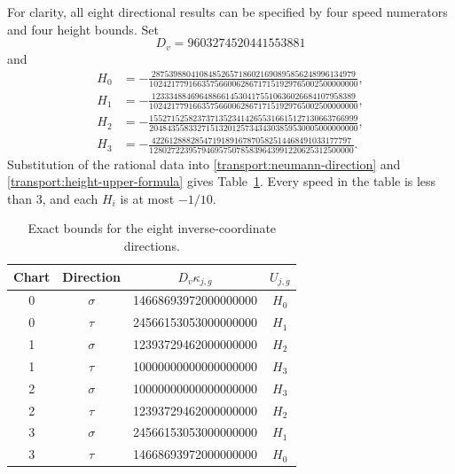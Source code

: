\documentclass[11pt,reqno]{amsart}
\theoremstyle{definition}
\theoremstyle{remark}
\begin{document}
For clarity, all eight directional results can be specified by four
speed numerators and four height bounds.  Set
\[
D_v=9603274520441553881
\]
and
\begin{align*}
H_0&=-\frac{28753988041084852657186021690895856248996134979}
                 {102421779166357566006286717151929765002500000000},\\
H_1&=-\frac{12333488469648866145304175510636026684107958389}
                 {102421779166357566006286717151929765002500000000},\\
H_2&=-\frac{155271525823737135234142655316615127130663766999}
                 {204843558332715132012573434303859530005000000000},\\
H_3&=-\frac{4226128882854719189167870582514468491033177797}
                 {12802722395794695750785839643991220625312500000}.
\end{align*}
Substitution of the rational data into
\eqref{transport:neumann-direction} and
\eqref{transport:height-upper-formula} gives
Table~\ref{transport:direction-table}.  Every speed in the table is
less than \(3\), and each \(H_i\) is at most \(-1/10\).
\begin{table}[htbp]
\centering
\caption{Exact bounds for the eight inverse-coordinate directions.}
\label{transport:direction-table}
\begin{tabular}{cccc}
\toprule
Chart & Direction & \(D_v\kappa_{j,g}\) & \(U_{j,g}\)\\
\midrule
0 & \(\sigma\) & 14668693972000000000 & \(H_0\)\\
0 & \(\tau\)   & 24566153053000000000 & \(H_1\)\\
1 & \(\sigma\) & 12393729462000000000 & \(H_2\)\\
1 & \(\tau\)   & 10000000000000000000 & \(H_3\)\\
2 & \(\sigma\) & 10000000000000000000 & \(H_3\)\\
2 & \(\tau\)   & 12393729462000000000 & \(H_2\)\\
3 & \(\sigma\) & 24566153053000000000 & \(H_1\)\\
3 & \(\tau\)   & 14668693972000000000 & \(H_0\)\\
\bottomrule
\end{tabular}
\end{table}
\end{document}
